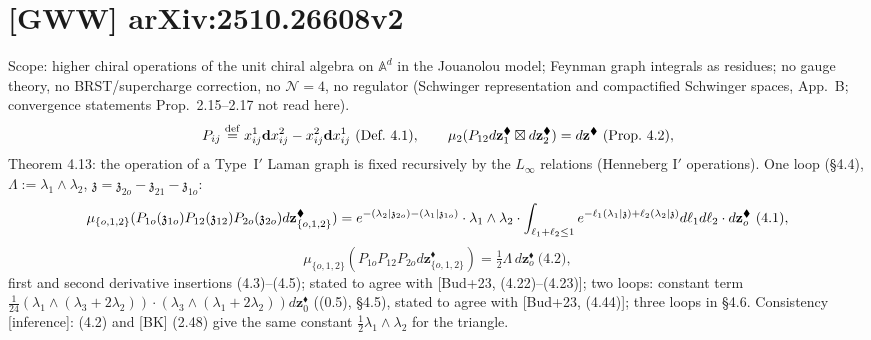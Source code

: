 \documentclass[10pt]{article}
\begin{document}
\section{[GWW] arXiv:2510.26608v2}
Scope: higher chiral operations of the unit chiral algebra on $\mathbb A^d$ in the Jouanolou model; Feynman graph integrals as residues; no gauge theory, no BRST/supercharge correction, no $\mathcal N=4$, no regulator (Schwinger representation and compactified Schwinger spaces, App.~B; convergence statements Prop.~2.15--2.17 not read here).
\begin{equation*}
P_{ij}\overset{\rm def}{=}x^1_{ij}\mathbf dx^2_{ij}-x^2_{ij}\mathbf dx^1_{ij}\ \text{(Def.~4.1)},\qquad \mu_2(P_{12}d\mathbf z^\blacklozenge_1\boxtimes d\mathbf z^\blacklozenge_2)=d\mathbf z^\blacklozenge\ \text{(Prop.~4.2)},
\end{equation*}
Theorem 4.13: the operation of a Type~I$'$ Laman graph is fixed recursively by the $L_\infty$ relations (Henneberg I$'$ operations). One loop (\S4.4), $\Lambda:=\lambda_1\wedge\lambda_2$, $\mathfrak z=\mathfrak z_{2o}-\mathfrak z_{21}-\mathfrak z_{1o}$:
\begin{equation*}
\mu_{\{o,1,2\}}(P_{1o}(\mathfrak z_{1o})P_{12}(\mathfrak z_{12})P_{2o}(\mathfrak z_{2o})d\mathbf z^\blacklozenge_{\{o,1,2\}})=e^{-(\lambda_2|\mathfrak z_{2o})-(\lambda_1|\mathfrak z_{1o})}\\\cdot\lambda_1\wedge\lambda_2\cdot\int_{\ell_1+\ell_2\le1}e^{-\ell_1(\lambda_1|\mathfrak z)+\ell_2(\lambda_2|\mathfrak z)}d\ell_1d\ell_2\cdot d\mathbf z^\blacklozenge_o\ \text{(4.1)},
\end{equation*}
\begin{equation*}
\mu_{\{o,1,2\}}(P_{1o}P_{12}P_{2o}d\mathbf z^\blacklozenge_{\{o,1,2\}})=\tfrac12\Lambda\,d\mathbf z^\blacklozenge_o\ \text{(4.2)},
\end{equation*}
first and second derivative insertions (4.3)--(4.5); stated to agree with [Bud+23, (4.22)--(4.23)]; two loops: constant term $\frac1{24}(\lambda_1\wedge(\lambda_3+2\lambda_2))\cdot(\lambda_3\wedge(\lambda_1+2\lambda_2))d\mathbf z^\blacklozenge_0$ ((0.5), \S4.5), stated to agree with [Bud+23, (4.44)]; three loops in \S4.6. Consistency [inference]: (4.2) and [BK] (2.48) give the same constant $\tfrac12\lambda_1\wedge\lambda_2$ for the triangle.
\end{document}

